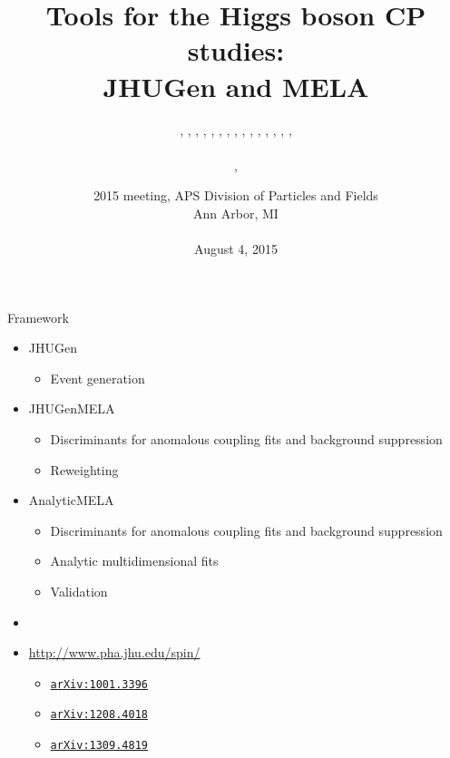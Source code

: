 \documentclass[usenames,dvipsnames,svgnames,table]{beamer}
\title[JHUGen and MELA]{Tools for the Higgs boson CP studies: \\ JHUGen and MELA}
\author[Heshy Roskes]{\CMS{I.~Anderson}, \CMS{S.~Bolognesi}, \theory{F.~Caola}, \ATLAS{Y.~Gao}, \CMS{A.~Gritsan}, \CMS{Z.~Guo}, \CMS{C.~Martin}, \theory{K.~Melnikov}, \me{Heshy~Roskes}, \CMS{U.~Sarica}, \theory{M.~Schulze}, \CMS{N.~Tran}, \CMS{A.~Whitbeck}, \CMS{M.~Xiao}, \CMS{C.~You}, \theory{Y.~Zhou}
\texorpdfstring{\\ \leavevmode
\\
\theory{Theory}, \experiment{experiment}}{}}
\date[August 4, 2015]{2015 meeting, APS Division of Particles and Fields\\
Ann Arbor, MI \\ \leavevmode \\
August 4, 2015}
\newcommand{\arxiv}[1]{\href{http://arxiv.org/abs/#1}{\nolinkurl{arXiv:#1}}}
\begin{document}
\begin{frame}
\titlepage
\end{frame}

\begin{frame}{Framework}

\begin{itemize}
\small
\item JHUGen
\begin{itemize}
\item Event generation
\end{itemize}
\item JHUGenMELA
\begin{itemize}
\item Discriminants for anomalous coupling fits and background suppression
\item Reweighting
\end{itemize}
\item AnalyticMELA
\begin{itemize}
\item Discriminants for anomalous coupling fits and background suppression
\item Analytic multidimensional fits
\item Validation
\end{itemize}
\item
\item \url{http://www.pha.jhu.edu/spin/}
\begin{itemize}
\item \arxiv{1001.3396}
\item \arxiv{1208.4018}
\item \arxiv{1309.4819}
\end{itemize}
\end{itemize}

\end{frame}
\end{document}
